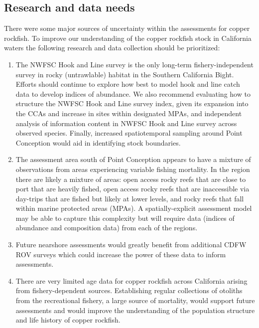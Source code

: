 \documentclass[11pt,
  english,
  letterpaper,
]{article}
\begin{document}
\hypertarget{research-and-data-needs}{%
\subsection*{Research and data needs}\label{research-and-data-needs}}

There were some major sources of uncertainty within the assessments for copper rockfish. To improve our understanding of the copper rockfish stock in California waters the following research and data collection should be prioritized:

\begin{enumerate}

  \item  The NWFSC Hook and Line survey is the only long-term fishery-independent survey in rocky (untrawlable) habitat in the Southern California Bight. Efforts should continue to explore how best to model hook and line catch data to develop indices of abundance. We also recommend evaluating how to structure the NWFSC Hook and Line survey index, given its expansion into the CCAs and increase in sites within designated MPAs, and independent analysis of information content in NWFSC Hook and Line survey across observed species. Finally, increased spatiotemporal sampling around Point Conception would aid in identifying stock boundaries.

    \item The assessment area south of Point Conception appears to have a mixture of observations from areas experiencing variable fishing mortality. In the region there are likely a mixture of areas: open access rocky reefs that are close to port that are heavily fished, open access rocky reefs that are inaccessible via day-trips that are fished but likely at lower levels, and rocky reefs that fall within marine protected areas (MPAs). A spatially-explicit assessment model may be able to capture this complexity but will require data (indices of abundance and composition data) from each of the regions. 
    
    \item Future nearshore assessments would greatly benefit from additional CDFW ROV surveys which could increase the power of these data to inform assessments.

    \item There are very limited age data for copper rockfish across California arising from fishery-dependent sources. Establishing regular collections of otoliths from the recreational fishery, a large source of mortality, would support future assessments and would improve the understanding of the population structure and life history of copper rockfish. 


\end{enumerate}
\end{document}

